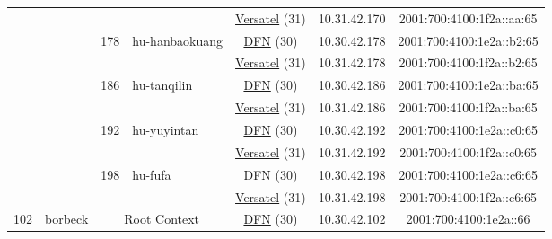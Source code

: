\begin{small}
\begin{center}
\begin{longtable}{|c|c|c|c|c|c|c|c|}
  &  &  &  & \multicolumn{2}{|c|}{\tiny{\href{http://www.versatel.de}{Versatel} (31)}} & \tiny{10.31.42.170} & \tiny{2001:700:4100:1f2a::aa:65} \\* \cline{3-3}\cline{4-4}\cline{5-5}\cline{6-6}\cline{7-7}\cline{8-8}
  &  & \multirow{2}{*}{\tiny{178}} & \multicolumn{1}{|l|}{\multirow{2}{*}{\tiny{hu-hanbaokuang}}} & \multicolumn{2}{|c|}{\tiny{\href{https://www.dfn.de}{DFN} (30)}} & \tiny{10.30.42.178} & \tiny{2001:700:4100:1e2a::b2:65} \\* \cline{5-5}\cline{6-6}\cline{7-7}\cline{8-8}
  &  &  &  & \multicolumn{2}{|c|}{\tiny{\href{http://www.versatel.de}{Versatel} (31)}} & \tiny{10.31.42.178} & \tiny{2001:700:4100:1f2a::b2:65} \\* \cline{3-3}\cline{4-4}\cline{5-5}\cline{6-6}\cline{7-7}\cline{8-8}
  &  & \multirow{2}{*}{\tiny{186}} & \multicolumn{1}{|l|}{\multirow{2}{*}{\tiny{hu-tanqilin}}} & \multicolumn{2}{|c|}{\tiny{\href{https://www.dfn.de}{DFN} (30)}} & \tiny{10.30.42.186} & \tiny{2001:700:4100:1e2a::ba:65} \\* \cline{5-5}\cline{6-6}\cline{7-7}\cline{8-8}
  &  &  &  & \multicolumn{2}{|c|}{\tiny{\href{http://www.versatel.de}{Versatel} (31)}} & \tiny{10.31.42.186} & \tiny{2001:700:4100:1f2a::ba:65} \\* \cline{3-3}\cline{4-4}\cline{5-5}\cline{6-6}\cline{7-7}\cline{8-8}
  &  & \multirow{2}{*}{\tiny{192}} & \multicolumn{1}{|l|}{\multirow{2}{*}{\tiny{hu-yuyintan}}} & \multicolumn{2}{|c|}{\tiny{\href{https://www.dfn.de}{DFN} (30)}} & \tiny{10.30.42.192} & \tiny{2001:700:4100:1e2a::c0:65} \\* \cline{5-5}\cline{6-6}\cline{7-7}\cline{8-8}
  &  &  &  & \multicolumn{2}{|c|}{\tiny{\href{http://www.versatel.de}{Versatel} (31)}} & \tiny{10.31.42.192} & \tiny{2001:700:4100:1f2a::c0:65} \\* \cline{3-3}\cline{4-4}\cline{5-5}\cline{6-6}\cline{7-7}\cline{8-8}
  &  & \multirow{2}{*}{\tiny{198}} & \multicolumn{1}{|l|}{\multirow{2}{*}{\tiny{hu-fufa}}} & \multicolumn{2}{|c|}{\tiny{\href{https://www.dfn.de}{DFN} (30)}} & \tiny{10.30.42.198} & \tiny{2001:700:4100:1e2a::c6:65} \\* \cline{5-5}\cline{6-6}\cline{7-7}\cline{8-8}
  &  &  &  & \multicolumn{2}{|c|}{\tiny{\href{http://www.versatel.de}{Versatel} (31)}} & \tiny{10.31.42.198} & \tiny{2001:700:4100:1f2a::c6:65} \\ \hline
 \multirow{30}{*}{\tiny{102}} & \multicolumn{1}{|l|}{\multirow{30}{*}{\tiny{borbeck}}} & \multicolumn{2}{|c|}{\multirow{2}{*}{\tiny{Root Context}}} & \multicolumn{2}{|c|}{\tiny{\href{https://www.dfn.de}{DFN} (30)}} & \tiny{10.30.42.102} & \tiny{2001:700:4100:1e2a::66} \\* \cline{5-5}\cline{6-6}\cline{7-7}\cline{8-8}

\end{longtable}
\end{center}
\end{small}

